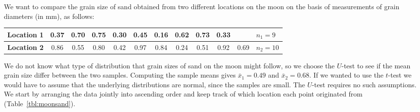 \begin{example}
We want to compare the grain size of sand obtained from two different locations on 
the moon on the basis of measurements of grain diameters (in mm), as follows:
\begin{table}[H]
\centering
\begin{tabular}{|l||c|c|c|c|c|c|c|c|c|c|l|} \hline
\bf{Location 1} & 0.37 & 0.70 & 0.75 & 0.30 & 0.45 & 0.16 & 0.62 & 0.73 & 0.33 &      & $n_1 = 9$ \\ \hline
\bf{Location 2} & 0.86 & 0.55 & 0.80 & 0.42 & 0.97 & 0.84 & 0.24 & 0.51 & 0.92 & 0.69 & $n_2 = 10$ \\ \hline
\end{tabular}
\end{table}
We do not know what type of distribution that grain sizes of sand on the moon might follow, so we choose the 
$U$-test to see if the mean grain size differ between the two samples.
Computing the sample means gives $\bar{x}_1 = 0.49$ and $\bar{x}_2 = 0.68$.  If we wanted to use the $t$-test we would have to 
assume that the underlying distributions are normal, since the samples are small.  The $U$-test requires no such assumptions.  
We start by arranging the data jointly into ascending order and keep track of which location each 
point originated from (Table~\ref{tbl:moonsand}).


\end{example}
